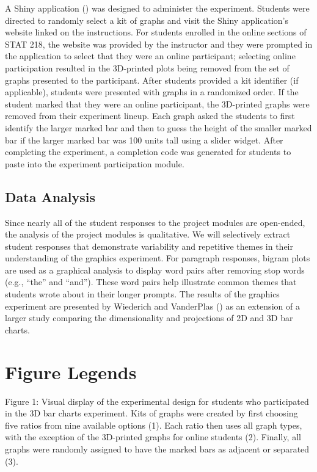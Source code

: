 \documentclass[
  12pt,
]{article}
\begin{document}
A Shiny application () was
designed to administer the experiment. Students were directed to
randomly select a kit of graphs and visit the Shiny application's
website linked on the instructions. For students enrolled in the online
sections of STAT 218, the website was provided by the instructor and
they were prompted in the application to select that they were an online
participant; selecting online participation resulted in the 3D-printed
plots being removed from the set of graphs presented to the participant.
After students provided a kit identifier (if applicable), students were
presented with graphs in a randomized order. If the student marked that
they were an online participant, the 3D-printed graphs were removed from
their experiment lineup. Each graph asked the students to first identify
the larger marked bar and then to guess the height of the smaller marked
bar if the larger marked bar was 100 units tall using a slider widget.
After completing the experiment, a completion code was generated for
students to paste into the experiment participation module.

\subsection{Data Analysis}\label{data-analysis}

Since nearly all of the student responses to the project modules are
open-ended, the analysis of the project modules is qualitative. We will
selectively extract student responses that demonstrate variability and
repetitive themes in their understanding of the graphics experiment. For
paragraph responses, bigram plots are used as a graphical analysis to
display word pairs after removing stop words (e.g., ``the'' and
``and''). These word pairs help illustrate common themes that students
wrote about in their longer prompts. The results of the graphics
experiment are presented by Wiederich and VanderPlas
() as an extension of a larger study
comparing the dimensionality and projections of 2D and 3D bar charts.

\section{Figure Legends}\label{figure-legends}

Figure 1: Visual display of the experimental design for students who
participated in the 3D bar charts experiment. Kits of graphs were
created by first choosing five ratios from nine available options (1).
Each ratio then uses all graph types, with the exception of the
3D-printed graphs for online students (2). Finally, all graphs were
randomly assigned to have the marked bars as adjacent or separated (3).
\end{document}
